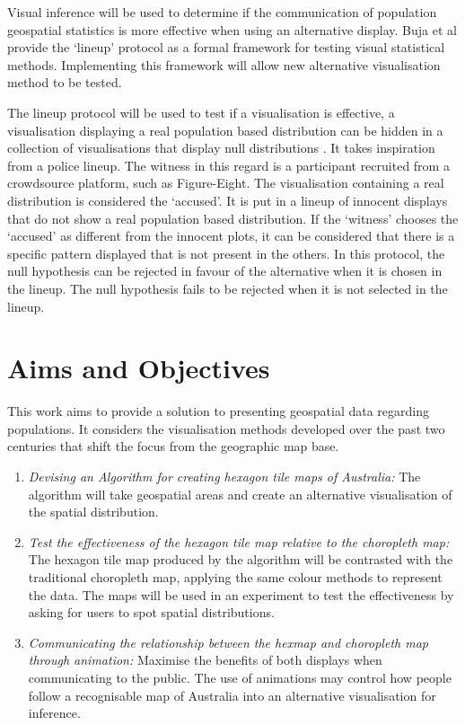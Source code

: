 \documentclass{monashthesis}
\begin{document}
Visual inference will be used to determine if the communication of population geospatial statistics is more effective when using an alternative display.
Buja et al \autocite{GIIV} provide the `lineup' protocol as a formal framework for testing visual statistical methods. Implementing this framework will allow new alternative visualisation method to be tested.

The lineup protocol will be used to test if a visualisation is effective, a visualisation displaying a real population based distribution can be hidden in a collection of visualisations that display null distributions \autocite{chowd}.
It takes inspiration from a police lineup.
The witness in this regard is a participant recruited from a crowdsource platform, such as Figure-Eight.
The visualisation containing a real distribution is considered the `accused'.
It is put in a lineup of innocent displays that do not show a real population based distribution.
If the `witness' chooses the `accused' as different from the innocent plots, it can be considered that there is a specific pattern displayed that is not present in the others.
In this protocol, the null hypothesis can be rejected in favour of the alternative when it is chosen in the lineup. The null hypothesis fails to be rejected when it is not selected in the lineup.

\hypertarget{sec:aims}{%
\section{Aims and Objectives}\label{sec:aims}}

This work aims to provide a solution to presenting geospatial data regarding populations.
It considers the visualisation methods developed over the past two centuries that shift the focus from the geographic map base.

\begin{enumerate}
\def\labelenumi{\arabic{enumi}.}
\item
  \emph{Devising an Algorithm for creating hexagon tile maps of Australia:} The algorithm will take geospatial areas and create an alternative visualisation of the spatial distribution.
\item
  \emph{Test the effectiveness of the hexagon tile map relative to the choropleth map:} The hexagon tile map produced by the algorithm will be contrasted with the traditional choropleth map, applying the same colour methods to represent the data. The maps will be used in an experiment to test the effectiveness by asking for users to spot spatial distributions.
\item
  \emph{Communicating the relationship between the hexmap and choropleth map through animation:} Maximise the benefits of both displays when communicating to the public. The use of animations may control how people follow a recognisable map of Australia into an alternative visualisation for inference.
\end{enumerate}
\end{document}
